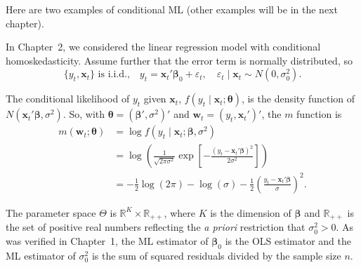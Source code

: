 Here are two examples of conditional ML (other examples will be in the next chapter).

\begin{example}
\label{ex:7.2}
In Chapter~2, we considered the linear regression model with conditional homoskedasticity. Assume further that the error term is normally distributed, so
\begin{equation}
\label{eq:7.1.12}
\{y_t, \mathbf{x}_t\} \text{ is i.i.d.,} \quad y_t = \mathbf{x}_t' \bm{\beta}_0 + \varepsilon_t, \quad \varepsilon_t \mid \mathbf{x}_t \sim N(0, \sigma_0^2).
\end{equation}

The conditional likelihood of $y_t$ given $\mathbf{x}_t$, $f(y_t \mid \mathbf{x}_t; \bm{\theta})$, is the density function of $N(\mathbf{x}_t' \bm{\beta}, \sigma^2)$. So, with $\bm{\theta} = (\bm{\beta}', \sigma^2)'$ and $\mathbf{w}_t = (y_t, \mathbf{x}_t')'$, the $m$ function is
\begin{equation}
\label{eq:7.1.13}
\begin{split}
m(\mathbf{w}_t; \bm{\theta}) &= \log f(y_t \mid \mathbf{x}_t; \bm{\beta}, \sigma^2) \\
&= \log \left( \frac{1}{\sqrt{2\pi\sigma^2}} \exp\left[ -\frac{(y_t - \mathbf{x}_t' \bm{\beta})^2}{2\sigma^2} \right] \right) \\
&= -\frac{1}{2}\log(2\pi) - \log(\sigma) - \frac{1}{2}\left( \frac{y_t - \mathbf{x}_t' \bm{\beta}}{\sigma} \right)^2.
\end{split}
\end{equation}

The parameter space $\Theta$ is $\mathbb{R}^K \times \mathbb{R}_{++}$, where $K$ is the dimension of $\bm{\beta}$ and $\mathbb{R}_{++}$ is the set of positive real numbers reflecting the \emph{a priori} restriction that $\sigma_0^2 > 0$. As was verified in Chapter~1, the ML estimator of $\bm{\beta}_0$ is the OLS estimator and the ML estimator of $\sigma_0^2$ is the sum of squared residuals divided by the sample size $n$.
\end{example}

